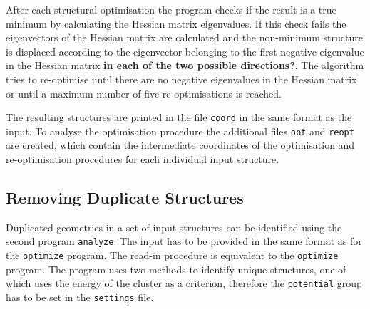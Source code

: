 After each structural optimisation the program checks if the result is a true
minimum by calculating the Hessian matrix eigenvalues. If this check fails the
eigenvectors of the Hessian matrix are calculated and the non-minimum structure
is displaced according to the eigenvector belonging to the first negative
eigenvalue in the Hessian matrix {\bf in each of the two possible directions?}. The algorithm tries to re-optimise until there
are no negative eigenvalues in the Hessian matrix or until a maximum number of
five re-optimisations is reached.

The resulting structures are printed in the file \texttt{coord} in the same
format as the input. To analyse the optimisation procedure the additional files
\texttt{opt} and \texttt{reopt} are created, which contain the intermediate
coordinates of the optimisation and re-optimisation procedures for each individual
input structure.

\subsection{Removing Duplicate Structures}
\label{sec:analysingresults}

Duplicated geometries in a set of input structures can be identified using the
second program \texttt{analyze}. The input has to be provided in the same format
as for the \texttt{optimize} program. The read-in procedure is equivalent to the
\texttt{optimize} program. The program uses two methods to identify unique
structures, one of which uses the energy of the cluster as a criterion,
therefore the \texttt{potential} group has to be set in the \texttt{settings}
file.

